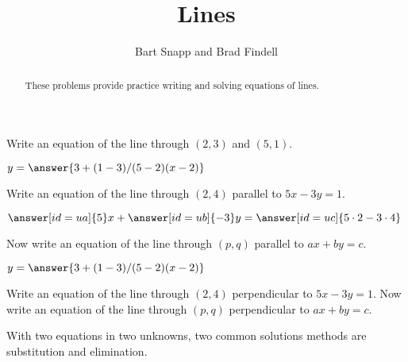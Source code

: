 \documentclass[nooutcomes]{ximera}
\title{Lines}
\author{Bart Snapp and Brad Findell}
\begin{document}
\begin{abstract}
These problems provide practice writing and solving equations of lines. 
\end{abstract}
\maketitle

\begin{problem}
Write an equation of the line through $(2,3)$ and $(5,1)$.  

\begin{prompt}
$y = \answer{3+(1-3)/(5-2)(x-2)}$
\end{prompt}
\end{problem}


\begin{problem}
Write an equation of the line through $(2,4)$ parallel to $5x-3y=1$.  

  \begin{prompt}
    \begin{validator}[(-3*ua==5*ub) && (-3*uc==(5*2-3*4)*ub) && (ub != 0)]
      \(
         \answer[id=ua]{5}x + \answer[id=ub]{-3}y = 
         \answer[id=uc]{5\cdot2-3\cdot4}
      \)
    \end{validator}
  \end{prompt}
\end{problem}



\begin{problem}
Now write an equation of the line through $(p,q)$ parallel to $ax+by=c$. 

\begin{prompt}
$y = \answer{3+(1-3)/(5-2)(x-2)}$
\end{prompt}
\end{problem}

\begin{problem}
Write an equation of the line through $(2,4)$ perpendicular to $5x-3y=1$.  
Now write an equation of the line through $(p,q)$ perpendicular to $ax+by=c$. 
\end{problem}


%
%
%
%
With two equations in two unknowns, two common solutions methods are substitution and elimination.  
\end{document}
